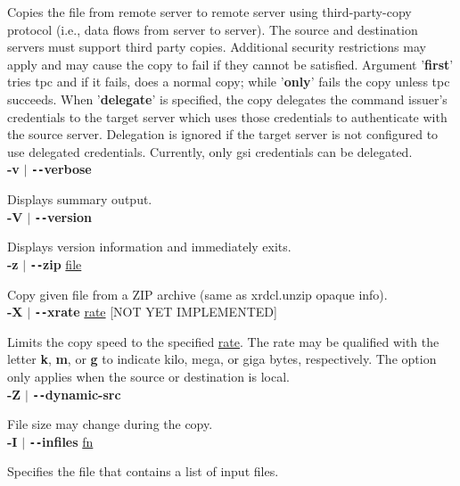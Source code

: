 \documentclass{article}
\begin{document}
		\noindent Copies the file from remote server to remote server using third-party-copy
		protocol (i.e., data flows from server to server). The source and destination
		servers must support third party copies. Additional security restrictions
		may apply and may cause the copy to fail if they cannot be satisfied.
		Argument '\textbf{first}' tries tpc and if it fails, does a normal copy;
		while '\textbf{only}' fails the copy unless tpc succeeds. When '\textbf{delegate}' is
		specified, the copy delegates the command issuer's credentials to the target
		server which uses those credentials to authenticate with the source server.
		Delegation is ignored if the target server is not configured to use delegated
		credentials. Currently, only gsi credentials can be delegated. \\
		
		\noindent \textbf{-v} $\vert$ \textbf{\texttt{-{}-}verbose}

		\noindent Displays summary output. \\
		
		\noindent \textbf{-V} $\vert$ \textbf{\texttt{-{}-}version}

		\noindent Displays version information and immediately exits. \\
		
		\noindent \textbf{-z} $\vert$ \textbf{\texttt{-{}-}zip} \underline{file}

		\noindent Copy given file from a ZIP archive (same as xrdcl.unzip opaque info). \\
		
		\noindent \textbf{-X} $\vert$ \textbf{\texttt{-{}-}xrate} \underline{rate} [NOT YET IMPLEMENTED]
		
		\noindent Limits the copy speed to the specified \underline{rate}. The rate may be qualified
		with the letter \textbf{k}, \textbf{m}, or \textbf{g} to indicate kilo, mega, or giga
		bytes, respectively. The option only applies when the source or destination is
		local. \\
		
		\noindent \textbf{-Z} $\vert$ \textbf{\texttt{-{}-}dynamic-src}

		\noindent File size may change during the copy. \\
		
		\noindent \textbf{-I} $\vert$ \textbf{\texttt{-{}-}infiles} \underline{fn}

		\noindent Specifies the file that contains a list of input files. \\
		
\end{document}
